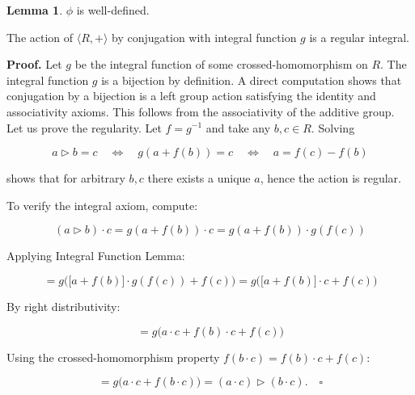 \documentclass[12pt]{article}
\theoremstyle{definition}
\newtheorem{lemma}[definition]{Lemma}
\begin{document}
\vspace{10pt}
\begin{lemma} $\phi$ is well-defined.

\vspace{5pt}
\noindent The action of $\langle R, +\rangle$ by conjugation with integral function $g$ is a regular integral.

\vspace{5pt}
\noindent\textbf{Proof.} Let $g$ be the integral function of some crossed-homomorphism on $R$. The integral function $g$ is a bijection by definition. A direct computation shows that conjugation by a bijection is a left group action satisfying the identity and associativity axioms. This follows from the associativity of the additive group.
\vspace{10pt}
\noindent Let us prove the regularity. Let $f = g^{-1}$ and take any $b, c \in R$. Solving  

\[
a \triangleright b = c \quad \Leftrightarrow \quad g(a + f(b)) = c \quad \Leftrightarrow \quad a = f(c) - f(b)
\]  

shows that for arbitrary $b, c$ there exists a unique $a$, hence the action is regular.

\vspace{10pt}
\noindent To verify the integral axiom, compute:  

\[
(a \triangleright b) \cdot c = g(a + f(b)) \cdot c = g(a + f(b)) \cdot g(f(c))
\]  

\noindent Applying Integral Function Lemma:  

\[
= g\big(\big[a + f(b)\big] \cdot g(f(c)) + f(c)\big) = g\big(\big[a + f(b)\big] \cdot c + f(c)\big)
\]  

\noindent By right distributivity:  

\[
= g\big(a \cdot c + f(b) \cdot c + f(c)\big)
\]  

\noindent Using the crossed-homomorphism property $f(b \cdot c) = f(b) \cdot c + f(c)$:  

\[
= g\big(a \cdot c + f(b \cdot c)\big) = (a \cdot c) \triangleright (b \cdot c). \quad \square
\]
\end{lemma}
\end{document}
